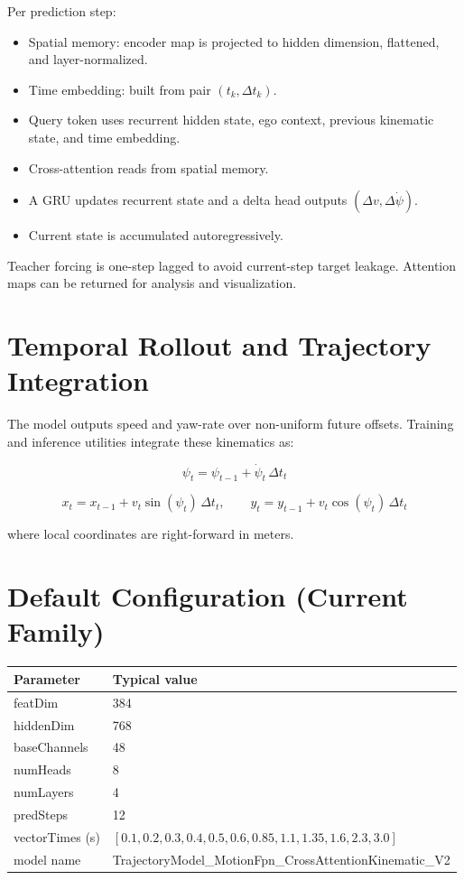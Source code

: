 \documentclass[a4paper,12pt]{article}
\begin{document}
Per prediction step:
\begin{itemize}
    \item Spatial memory: encoder map is projected to hidden dimension, flattened, and layer-normalized.
    \item Time embedding: built from pair $(t_k,\Delta t_k)$.
    \item Query token uses recurrent hidden state, ego context, previous kinematic state, and time embedding.
    \item Cross-attention reads from spatial memory.
    \item A GRU updates recurrent state and a delta head outputs $(\Delta v,\Delta \dot{\psi})$.
    \item Current state is accumulated autoregressively.
\end{itemize}

Teacher forcing is one-step lagged to avoid current-step target leakage.
Attention maps can be returned for analysis and visualization.

\section{Temporal Rollout and Trajectory Integration}
The model outputs speed and yaw-rate over non-uniform future offsets.
Training and inference utilities integrate these kinematics as:

\[
\psi_t = \psi_{t-1} + \dot{\psi}_t\,\Delta t_t
\]

\[
x_t = x_{t-1} + v_t\sin(\psi_t)\,\Delta t_t,
\qquad
y_t = y_{t-1} + v_t\cos(\psi_t)\,\Delta t_t
\]

where local coordinates are right-forward in meters.

\section{Default Configuration (Current Family)}

\begin{center}
\begin{tabular}{@{}ll@{}}
\toprule
Parameter & Typical value \\
\midrule
featDim & 384 \\
hiddenDim & 768 \\
baseChannels & 48 \\
numHeads & 8 \\
numLayers & 4 \\
predSteps & 12 \\
vectorTimes (s) & $[0.1,0.2,0.3,0.4,0.5,0.6,0.85,1.1,1.35,1.6,2.3,3.0]$ \\
model name & TrajectoryModel\_MotionFpn\_CrossAttentionKinematic\_V2 \\
\bottomrule
\end{tabular}
\end{center}
\end{document}
